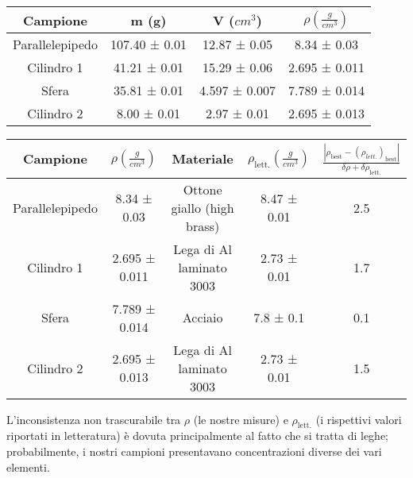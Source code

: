 \documentclass{article}
\begin{document}
\begin{center}
    \begin{tabular}{ |c|c|c|c| }
        \hline
        Campione & m (g) & V ($cm^3$) & $\rho \left(\frac{g}{cm^3}\right)$ \\
        \hline
        Parallelepipedo & 107.40 ± 0.01 & 12.87 ± 0.05 & 8.34 ± 0.03 \\
        Cilindro 1 & 41.21 ± 0.01 & 15.29 ± 0.06 & 2.695 ± 0.011 \\
        Sfera & 35.81 ± 0.01 & 4.597 ± 0.007 & 7.789 ± 0.014 \\
        Cilindro 2 & 8.00 ± 0.01 & 2.97 ± 0.01 & 2.695 ± 0.013 \\
        \hline
    \end{tabular}

    \begin{tabular}{ |c|c|c|c|c| }
        \hline
        Campione & $\rho \left(\frac{g}{cm^3}\right)$ & Materiale & $\rho_\text{lett.} \left(\frac{g}{cm^3}\right)$ & $\frac{\left|\rho_\text{best} - \left(\rho_{lett.}\right)_\text{best}\right|}{\delta \rho + \delta \rho_\text{lett.}}$ \\
        \hline
        Parallelepipedo & 8.34 ± 0.03 & Ottone giallo (high brass) & 8.47 ± 0.01 & 2.5 \\
        \hline
        Cilindro 1 & 2.695 ± 0.011 & Lega di Al laminato 3003 & 2.73 ± 0.01 & 1.7 \\
        \hline
        Sfera & 7.789 ± 0.014 & Acciaio & 7.8 ± 0.1 & 0.1 \\
        \hline
        Cilindro 2 & 2.695 ± 0.013 & Lega di Al laminato 3003 & 2.73 ± 0.01 & 1.5 \\
        \hline
    \end{tabular}
\end{center}

L'inconsistenza non trascurabile tra $\rho$ (le nostre misure) e $\rho_\text{lett.}$ (i rispettivi valori riportati in letteratura) è dovuta principalmente al fatto che si tratta di leghe; probabilmente, i nostri campioni presentavano concentrazioni diverse dei vari elementi.
\end{document}
